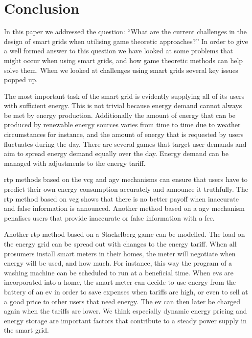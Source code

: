 \section{Conclusion}\label{conclusion}
\acresetall
In this paper we addressed the question: ``What are the current challenges in the design of smart grids when utilising game theoretic approaches?'' In order to give a well formed answer to this question we have looked at some problems that might occur when using smart grids, and how game theoretic methods can help solve them. When we looked at challenges using smart grids several key issues popped up. 

The most important task of the smart grid is evidently supplying all of its users with sufficient energy. This is not trivial because energy demand cannot always be met by energy production. Additionally the amount of energy that can be produced by renewable energy sources varies from time to time due to weather circumstances for instance, and the amount of energy that is requested by users fluctuates during the day. There are several games that target user demands and aim to spread energy demand equally over the day. Energy demand can be managed with adjustments to the energy tariff. 

\ac{rtp} methods based on the \ac{vcg} and \ac{agv} mechanisms can ensure that users have to predict their own energy consumption accurately and announce it truthfully. The \ac{rtp} method based on \ac{vcg} shows that there is no better payoff when inaccurate and false information is announced. Another method based on a \ac{agv} mechanism penalises users that provide inaccurate or false information with a fee.

Another \ac{rtp} method based on a Stackelberg game can be modelled. The load on the energy grid can be spread out with changes to the energy tariff. When all prosumers install smart meters in their homes, the meter will negotiate when energy will be used, and how much. For instance, this way the program of a washing machine can be scheduled to run at a beneficial time. When \acp{ev} are incorporated into a home, the smart meter can decide to use energy from the battery of an \ac{ev} in order to save expenses when tariffs are high, or even to sell at a good price to other users that need energy. The \ac{ev} can then later be charged again when the tariffs are lower. 
We think especially dynamic energy pricing and energy storage are important factors that contribute to a steady power supply in the smart grid.

